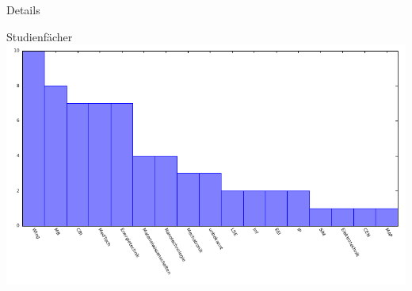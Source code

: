 \documentclass[]{beamer}
\begin{document}
\begin{frame}{Details}
	\begin{center}
		Studienfächer
	\includegraphics[scale=0.9]{plots/emailkryptunbek.pdf}
\end{center}
\end{frame}
\end{document}
